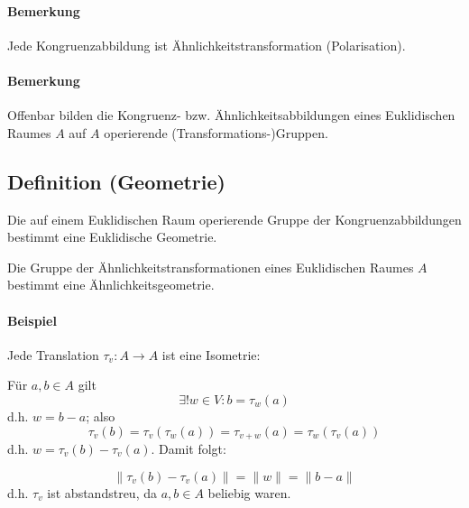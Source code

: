\paragraph{Bemerkung}
	Jede Kongruenzabbildung ist Ähnlichkeitstransformation (Polarisation).
\paragraph{Bemerkung}
	Offenbar bilden die Kongruenz- bzw. Ähnlichkeitsabbildungen eines Euklidischen Raumes $ A $ auf $ A $ operierende (Transformations-)Gruppen.
	
\subsection{Definition (Geometrie)}
\begin{Definition}
	Die auf einem Euklidischen Raum operierende Gruppe der Kongruenzabbildungen bestimmt eine Euklidische Geometrie.
	
	Die Gruppe der Ähnlichkeitstransformationen eines Euklidischen Raumes $ A $ bestimmt eine Ähnlichkeitsgeometrie.
\end{Definition}


\paragraph{Beispiel}
Jede Translation $ \tau_v:A\to A $ ist eine Isometrie:

\begin{minipage}[t]{0.55\linewidth}
	Für $ a,b\in A $ gilt
		\[ \exists!w\in V: b=\tau_w(a) \]
	d.h. $ w=b-a $; also
		\[ \tau_v(b) = \tau_v(\tau_w(a)) = \tau_{v+w}(a) = \tau_w(\tau_v (a)) \]
	d.h. $ w = \tau_v(b)-\tau_v(a) $.
	Damit folgt:
\end{minipage}
\hfill
\begin{minipage}[t]{0.4\linewidth}
 	\begin{figure}[H]\centering
 		
	\end{figure}
\end{minipage}
	\[ \|\tau_v(b)-\tau_v(a)\| = \|w\| = \|b-a\| \]
	d.h. $ \tau_v $ ist abstandstreu, da $ a,b\in A $ beliebig waren.

